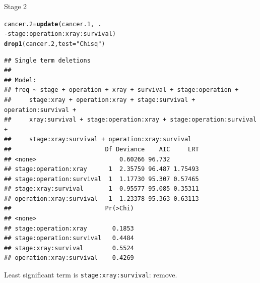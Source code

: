 \documentclass[unknownkeysallowed]{beamer}\usepackage[]{graphicx}\usepackage[]{color}
\makeatletter
\newcommand{\hlstr}[1]{\textcolor[rgb]{0.192,0.494,0.8}{#1}}%
\newcommand{\hlopt}[1]{\textcolor[rgb]{0,0,0}{#1}}%
\newcommand{\hlstd}[1]{\textcolor[rgb]{0.345,0.345,0.345}{#1}}%
\newcommand{\hlkwb}[1]{\textcolor[rgb]{0.69,0.353,0.396}{#1}}%
\newcommand{\hlkwc}[1]{\textcolor[rgb]{0.333,0.667,0.333}{#1}}%
\newcommand{\hlkwd}[1]{\textcolor[rgb]{0.737,0.353,0.396}{\textbf{#1}}}%
\newenvironment{kframe}{%
 \def\at@end@of@kframe{}%
 \ifinner\ifhmode%
  \def\at@end@of@kframe{\end{minipage}}%
  \begin{minipage}{\columnwidth}%
 \fi\fi%
 \def\FrameCommand##1{\hskip\@totalleftmargin \hskip-\fboxsep
 \colorbox{shadecolor}{##1}\hskip-\fboxsep
     \hskip-\linewidth \hskip-\@totalleftmargin \hskip\columnwidth}%
 \MakeFramed {\advance\hsize-\width
   \@totalleftmargin\z@ \linewidth\hsize
   \@setminipage}}%
 {\par\unskip\endMakeFramed%
 \at@end@of@kframe}
\newenvironment{knitrout}{}{} %
\makeatother
\begin{document}
\begin{frame}[fragile]{Stage 2}
  
\begin{knitrout}\scriptsize
{}\color{fgcolor}\begin{kframe}
\begin{alltt}
\hlstd{cancer.2}\hlkwb{=}\hlkwd{update}\hlstd{(cancer.1,}\hlopt{~}\hlstd{.}
\hlopt{-}\hlstd{stage}\hlopt{:}\hlstd{operation}\hlopt{:}\hlstd{xray}\hlopt{:}\hlstd{survival)}
\hlkwd{drop1}\hlstd{(cancer.2,}\hlkwc{test}\hlstd{=}\hlstr{"Chisq"}\hlstd{)}
\end{alltt}
\begin{verbatim}
## Single term deletions
## 
## Model:
## freq ~ stage + operation + xray + survival + stage:operation + 
##     stage:xray + operation:xray + stage:survival + operation:survival + 
##     xray:survival + stage:operation:xray + stage:operation:survival + 
##     stage:xray:survival + operation:xray:survival
##                          Df Deviance    AIC     LRT
## <none>                       0.60266 96.732        
## stage:operation:xray      1  2.35759 96.487 1.75493
## stage:operation:survival  1  1.17730 95.307 0.57465
## stage:xray:survival       1  0.95577 95.085 0.35311
## operation:xray:survival   1  1.23378 95.363 0.63113
##                          Pr(>Chi)
## <none>                           
## stage:operation:xray       0.1853
## stage:operation:survival   0.4484
## stage:xray:survival        0.5524
## operation:xray:survival    0.4269
\end{verbatim}
\end{kframe}
\end{knitrout}

Least significant term is \texttt{stage:xray:survival}: remove.

  
\end{frame}
\end{document}
